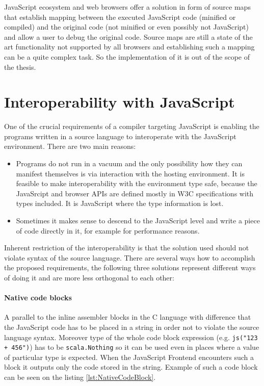 \documentclass[12pt,a4paper]{report}
\begin{document}
JavaScript ecosystem and web browsers offer a solution in form of source maps \cite{SourceMaps} that establish mapping between the executed JavaScript code (minified or compiled) and the original code (not minified or even possibly not JavaScript) and allow a user to debug the original code. Source maps are still a state of the art functionality not supported by all browsers and establishing such a mapping can be a quite complex task. So the implementation of it is out of the scope of the thesis.

\section{Interoperability with JavaScript}

One of the crucial requirements of a compiler targeting JavaScript is enabling the programs written in a source language to interoperate with the JavaScript environment. There are two main reasons:

\begin{itemize} 
\item Programs do not run in a vacuum and the only possibility how they can manifest themselves is via interaction with the hosting environment. It is feasible to make interoperability with the environment type safe, because the JavaSrcipt and  browser APIs are defined mostly in W3C \cite{W3c} specifications with types included. It is JavaScript where the type information is lost. 
\item Sometimes it makes sense to descend to the JavaScript level and write a piece of code directly in it, for example for performance reasons. 
\end{itemize}

Inherent restriction of the interoperability is that the solution used should not violate syntax of the source language. There are several ways how to accomplish the proposed requirements, the following three solutions represent different ways of doing it and are more less orthogonal to each other: 

\paragraph{Native code blocks} A parallel to the inline assembler blocks in the C language with difference that the JavaScript code has to be placed in a string in order not to violate the source language syntax. Moreover type of the whole code block expression (e.g. \texttt{js("123 + 456")}) has to be \texttt{scala.Nothing} so it can be used even in places where a value of particular type is expected. When the JavaScript Frontend encounters such a block it outputs only the code stored in the string. Example of such a code block can be seen on the listing \ref{lst:NativeCodeBlock}.
\end{document}
